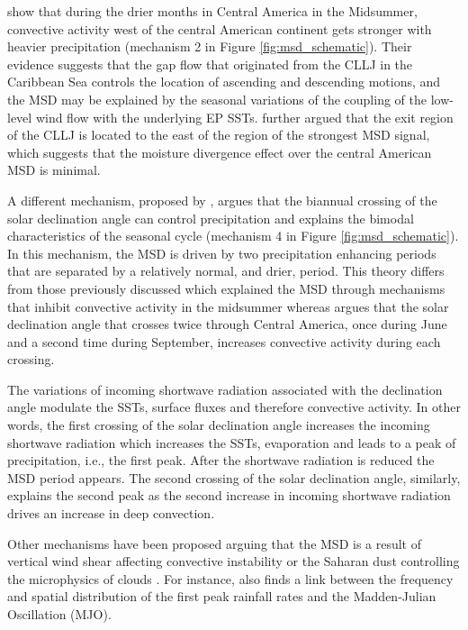  \cite{herrera2015} show that during the drier months in Central America in the Midsummer, convective activity west of the central American continent gets stronger with heavier precipitation (mechanism 2 in Figure \ref{fig:msd_schematic}).  Their evidence suggests that the gap flow that originated from the CLLJ in the Caribbean Sea controls the location of ascending and descending motions, and the MSD may be explained by the seasonal variations of the coupling of the low-level wind flow with the underlying EP SSTs.
\cite{herrera2015} further argued that the exit region of the CLLJ is located to the east of the region of the strongest MSD signal, which suggests that the moisture divergence effect over the central American MSD is minimal. 

A different mechanism, proposed by \cite{karnauskas2013}, argues that the biannual crossing of the solar declination angle can control precipitation and explains the bimodal characteristics of the seasonal cycle (mechanism 4 in Figure \ref{fig:msd_schematic}). In this mechanism, the MSD is driven by two precipitation enhancing periods that are separated by a relatively normal, and drier, period. This theory differs from those previously discussed which explained the MSD through mechanisms that inhibit convective activity in the midsummer whereas \cite{karnauskas2013} argues that the solar declination angle that crosses twice through Central America, once during June and a second time during September, increases convective activity during each crossing. 

The variations of incoming shortwave radiation associated with the declination angle modulate the SSTs, surface fluxes and therefore convective activity. In other words, the first crossing of the solar declination angle increases the incoming shortwave radiation which increases the SSTs, evaporation and leads to a peak of precipitation, i.e., the first peak. After the shortwave radiation is reduced the MSD period appears. The second crossing of the solar declination angle, similarly, explains the second peak as the second increase in incoming shortwave radiation drives an increase in deep convection.%

Other mechanisms have been proposed arguing that the MSD is a result of vertical wind shear affecting convective instability or the Saharan dust controlling  the microphysics of clouds \citep{angeles2010origins}.
For instance, \cite{perdigon2019} also finds a link between the frequency and spatial distribution of the first peak rainfall rates and the Madden-Julian Oscillation (MJO). 
 
